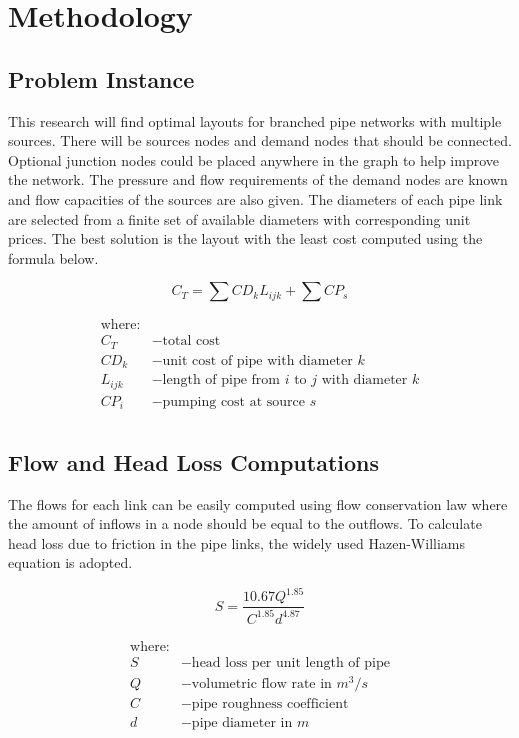 \section{Methodology}
\subsection{Problem Instance}
This research will find optimal layouts for branched pipe networks with multiple sources. There will be sources nodes and demand nodes that should be connected. Optional junction nodes could be placed anywhere in the graph to help improve the network. The pressure and flow requirements of the demand nodes are known and flow capacities of the sources are also given. The diameters of each pipe link are selected from a finite set of available diameters with corresponding unit prices. The best solution is the layout with the least cost computed using the formula below.

\begin{equation}
\label{cost_function}
C_T = {\sum CD_kL_{ijk}} + {\sum CP_s}
\end{equation}

\begin{align*}
    \text{where:}& \\
    C_T &- \text{total cost} \\
    CD_k &- \text{unit cost of pipe with diameter $k$} \\
    L_{ijk} &- \text{length of pipe from $i$ to $j$ with diameter $k$} \\
    CP_i &- \text{pumping cost at source $s$} \\
\end{align*}

\subsection{Flow and Head Loss Computations}
The flows for each link can be easily computed using flow conservation law where the amount of inflows in a node should be equal to the outflows. To calculate head loss due to friction in the pipe links, the widely used Hazen-Williams equation is adopted.

\begin{equation}
\label{hazen_williams}
S = \frac{10.67Q^{1.85}}{C^{1.85}d^{4.87}}
\end{equation}

\begin{align*}
    \text{where:}& \\
    S &- \text{head loss per unit length of pipe} \\
    Q &- \text{volumetric flow rate in $m^3/s$} \\
    C &- \text{pipe roughness coefficient} \\
    d &- \text{pipe diameter in $m$} \\
\end{align*}

